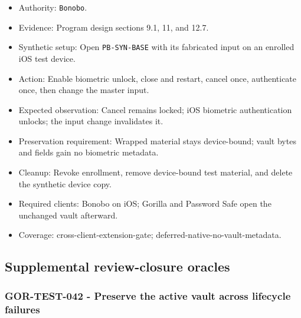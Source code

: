 \documentclass[
  letterpaper,
]{article}
\newcommand{\passthrough}[1]{#1}
\providecommand{\tightlist}{%
  \setlength{\itemsep}{0pt}\setlength{\parskip}{0pt}}
\begin{document}
\begin{itemize}
\tightlist
\item
  Authority: \passthrough{\lstinline!Bonobo!}.
\item
  Evidence: Program design sections 9.1, 11, and 12.7.
\item
  Synthetic setup: Open \nolinkurl{PB-SYN-BASE} with its fabricated input on an enrolled iOS test device.
\item
  Action: Enable biometric unlock, close and restart, cancel once, authenticate once, then change the master input.
\item
  Expected observation: Cancel remains locked; iOS biometric authentication unlocks; the input change invalidates it.
\item
  Preservation requirement: Wrapped material stays device-bound; vault bytes and fields gain no biometric metadata.
\item
  Cleanup: Revoke enrollment, remove device-bound test material, and delete the synthetic device copy.
\item
  Required clients: Bonobo on iOS; Gorilla and Password Safe open the unchanged vault afterward.
\item
  Coverage: cross-client-extension-gate; deferred-native-no-vault-metadata.
\end{itemize}

\subsection{Supplemental review-closure oracles}\label{supplemental-review-closure-oracles}

\subsubsection{GOR-TEST-042 - Preserve the active vault across lifecycle
failures}\label{gor-test-042---preserve-the-active-vault-across-lifecycle-failures}
\end{document}
